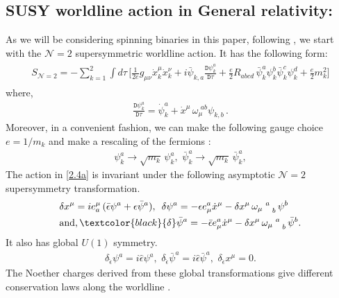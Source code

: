 \subsection*{SUSY worldline action in General relativity:}
As we will be considering spinning binaries in this paper, following \cite{Jakobsen:2021zvh}, we start with the $\mathcal{N}=2$ supersymmetric worldline action. It  has the following form:
\begin{align}
    \begin{split}
        S_{\mathcal{N}=2}=-\sum_{k=1}^2 
        \int d\tau\, \Big[\frac{1}{2e}g_{\mu\nu}\dot x_k^{\mu}\dot x_k^{\nu}+i\bar \psi_{k,a}\frac{\mathtt{D}\psi^a_k}{\mathtt{D}\tau}+\frac{e}{2}R_{abcd}\,\bar \psi^a_k \psi^b_k \bar \psi^c_k \psi^d_k+\frac{e}{2}m_k^2\Big]
    \end{split}\label{2.4a}
\end{align}
where,
\begin{align}
    \frac{\mathtt{D}\psi ^a_k}{\mathtt{D}\tau}= \dot\psi_k^a+\dot x^\mu\, \omega_{\mu}^{\,\,ab}\psi_{k,b}\,.
\end{align}
Moreover, in a convenient fashion, we can make the following gauge choice $e=1/m_k$ and make a rescaling of the fermions \cite{Jakobsen:2021zvh}:
\begin{align}
    \psi_k^a \to \sqrt{m_k}\,\psi_k^a,\,\,\bar\psi_k^a \to \sqrt{m_k}\,\bar\psi_k^a,
\end{align}
The action in \eqref{2.4a} is invariant under the following asymptotic $\mathcal{N}=2$ supersymmetry transformation.
\begin{align}
    \begin{split}
    &    \delta x^\mu=ie^{\mu}_a\,(\bar\epsilon\psi^a+\epsilon\bar\psi^ a),\,\,\,\delta \psi^a=-\epsilon e^{a}_\mu \dot x^\mu-\delta x^\mu\,{\omega_{\mu}}^{\,\,a}_{\,\,\,\,\,\,\,b}\,\psi^b\\ &
    \textrm{and,}\,\textcolor{black}{\delta}\bar\psi^a=-\bar\epsilon e^{a}_\mu \dot x^\mu-\delta x^\mu\,{\omega_{\mu}}^{\,\,a}_{\,\,\,\,\,\,\,b}\,\bar\psi^b.
    \end{split}
\end{align}
It also has global $U(1)$ symmetry.
\begin{align}
    \delta_{\hat\epsilon}\psi^a=i\hat\epsilon \psi^a,\,\,\delta_{\hat\epsilon}\bar\psi^a=i\hat\epsilon \bar\psi^a,\,\,\delta_{\hat\epsilon}x^\mu=0.
\end{align}
The Noether charges derived from these global transformations give different conservation laws along the worldline \cite{Jakobsen:2021zvh}.\par
